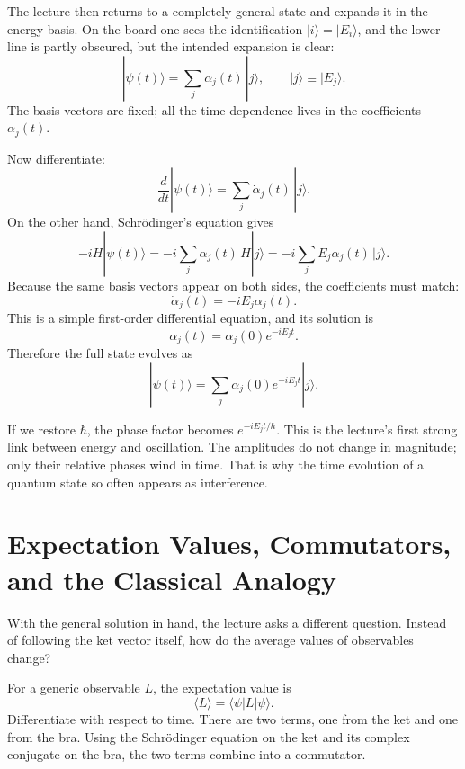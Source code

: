 The lecture then returns to a completely general state and expands it in the energy basis. On the board one sees the identification \(|i\rangle = |E_i\rangle\), and the lower line is partly obscured, but the intended expansion is clear:
\begin{equation}
|\psi(t)\rangle = \sum_j \alpha_j(t)\,|j\rangle,
\qquad
|j\rangle \equiv |E_j\rangle.
\end{equation}
The basis vectors are fixed; all the time dependence lives in the coefficients \(\alpha_j(t)\).

Now differentiate:
\begin{equation}
\frac{d}{dt}|\psi(t)\rangle = \sum_j \dot{\alpha}_j(t)\,|j\rangle.
\end{equation}
On the other hand, Schr\"odinger's equation gives
\begin{equation}
-iH|\psi(t)\rangle
=
-i\sum_j \alpha_j(t)\,H|j\rangle
=
-i\sum_j E_j\alpha_j(t)\,|j\rangle.
\end{equation}
Because the same basis vectors appear on both sides, the coefficients must match:
\begin{equation}
\dot{\alpha}_j(t) = -iE_j \alpha_j(t).
\end{equation}
This is a simple first-order differential equation, and its solution is
\begin{equation}
\alpha_j(t) = \alpha_j(0)e^{-iE_j t}.
\end{equation}
Therefore the full state evolves as
\begin{equation}
|\psi(t)\rangle = \sum_j \alpha_j(0)e^{-iE_j t}|j\rangle.
\end{equation}

If we restore \(\hbar\), the phase factor becomes \(e^{-iE_j t/\hbar}\). This is the lecture's first strong link between energy and oscillation. The amplitudes do not change in magnitude; only their relative phases wind in time. That is why the time evolution of a quantum state so often appears as interference.

\section{Expectation Values, Commutators, and the Classical Analogy}

With the general solution in hand, the lecture asks a different question. Instead of following the ket vector itself, how do the average values of observables change?

For a generic observable \(L\), the expectation value is
\begin{equation}
\langle L\rangle = \langle \psi|L|\psi\rangle.
\end{equation}
Differentiate with respect to time. There are two terms, one from the ket and one from the bra. Using the Schr\"odinger equation on the ket and its complex conjugate on the bra, the two terms combine into a commutator.

